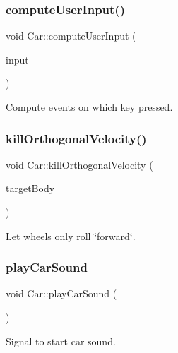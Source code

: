 \subsubsection{\texorpdfstring{computeUserInput()}{computeUserInput()}}
{\footnotesize\ttfamily void Car\+::compute\+User\+Input (\begin{DoxyParamCaption}\item[{enum \mbox{\hyperlink{car_8h_aecfb003a08d29c0b75cd266ca0cadb76}{Input\+State}}}]{input }\end{DoxyParamCaption})}



Compute events on which key pressed. 

\mbox{\label{class_car_a3655a9289056301defdf00d2314f8bf9}} 
\subsubsection{\texorpdfstring{killOrthogonalVelocity()}{killOrthogonalVelocity()}}
{\footnotesize\ttfamily void Car\+::kill\+Orthogonal\+Velocity (\begin{DoxyParamCaption}\item[{\mbox{\hyperlink{classb2_body}{b2\+Body}} $\ast$}]{target\+Body }\end{DoxyParamCaption})}



Let wheels only roll \char`\"{}forward\char`\"{}. 

\mbox{\label{class_car_a971c03c0eb6b0b4f8be93e7c3ec0207e}} 
\subsubsection{\texorpdfstring{playCarSound}{playCarSound}}
{\footnotesize\ttfamily void Car\+::play\+Car\+Sound (\begin{DoxyParamCaption}{ }\end{DoxyParamCaption})\hspace{0.3cm}{\ttfamily [signal]}}



Signal to start car sound. 

\mbox{\label{class_car_a8b2c63e132d20df63f402071aeba393c}} 
